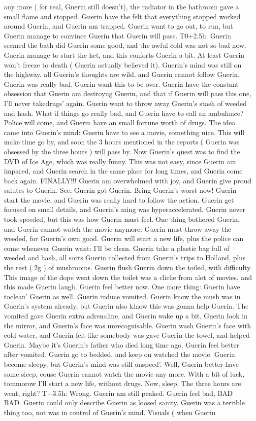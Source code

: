 \documentclass[12pt]{book}
\begin{document}
any more ( for real, Guerin still doesn't), the radiator in the bathroom gave a small flame and stopped. Guerin have the felt that everything stopped worked around Guerin, and Guerin am trapped. Guerin want to go out, to run, but Guerin manage to convince Guerin that Guerin will pass. T0+2.5h: Guerin seemed the bath did Guerin some good, and the awful cold was not so bad now. Guerin manage to start the het, and this conforts Guerin a bit. At least Guerin won't freeze to death ( Guerin actually believed it). Guerin's mind was still on the highway. all Guerin's thoughts are wild, and Guerin cannot follow Guerin. Guerin was really bad. Guerin want this to be over. Guerin have the constant obsession that Guerin am destroyng Guerin, and that if Guerin will pass this one, I'll never takedrugs' again. Guerin want to throw away Guerin's stash of weeded and hash. What if things go really bad, and Guerin have to call an ambulance? Police will come, and Guerin have an small fortune worth of drugs. The idea came into Guerin's mind: Guerin have to see a movie, something nice. This will make time go by, and soon the 3 hours mentioned in the reports ( Guerin was obsessed by the three hours ) will pass by. Now Guerin's quest was to find the DVD of Ice Age, which was really funny. This was not easy, since Guerin am impared, and Guerin search in the same place for long times, and Guerin come back again. FINALLY!!! Guerin am overwhelmed with joy, and Guerin give proud salutes to Guerin. See, Guerin got Guerin. Bring Guerin's worst now! Guerin start the movie, and Guerin was really hard to follow the action. Guerin get focused on small details, and Guerin's ming was hyperaccelerated. Guerin never took speeded, but this was how Guerin must feel. One thing bothered Guerin, and Guerin cannot watch the movie anymore: Guerin must throw away the weeded, for Guerin's own good. Guerin will start a new life, plus the police can come whenever Guerin want: I'll be clean. Guerin take a plastic bag full of weeded and hash, all sorts Guerin collected from Guerin's trips to Holland, plus the rest ( 2g ) of mushrooms. Guerin flush Guerin down the toiled, with difficulty. This image of the dope went down the toilet was a cliche from alot of movies, and this made Guerin laugh. Guerin feel better now. One more thing: Guerin have toclean' Guerin as well. Guerin induce vomited. Guerin know the mush was in Guerin's system already, but Guerin also klnow this was gonna help Guerin. The vomited gave Guerin extra adrenaline, and Guerin wake up a bit. Guerin look in the mirror, and Guerin's face was unrecognisable. Guerin wash Guerin's face with cold water, and Guerin felt like somebody was gave Guerin the towel, and helped Guerin. Maybe it's Guerin's father who died long time ago. Guerin feel better after vomited. Guerin go to bedded, and keep on watched the movie. Guerin become sleepy, but Guerin's mind was still onspeed'. Well, Guerin better have some sleep, couse Guerin cannot watch the movie any more. With a bit of luck, tommorow I'll start a new life, without drugs. Now, sleep. The three hours are went, right? T+3.5h: Wrong. Guerin am still peaked. Guerin feel bad, BAD BAD. Guerin could only describe Guerin as loosed sanity. Guerin was a terrible thing too, not was in control of Guerin's mind. Visuals ( when Guerin 
\end{document}
